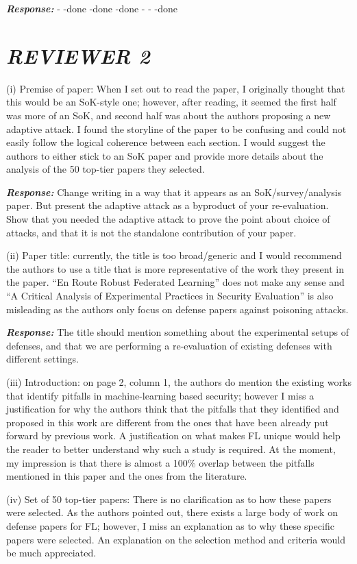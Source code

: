 \textbf{\textit{Response:}}
-
-done
-done
-done
-
-
-done


\section{\textbf{\textit{REVIEWER 2}}}

(i) Premise of paper: When I set out to read the paper, I originally thought that this would be an SoK-style one; however, after reading, it seemed the first half was more of an SoK, and second half was about the authors proposing a new adaptive attack. I found the storyline of the paper to be confusing and could not easily follow the logical coherence between each section. I would suggest the authors to either stick to an SoK paper and provide more details about the analysis of the 50 top-tier papers they selected.

\textbf{\textit{Response:}}
Change writing in a way that it appears as an SoK/survey/analysis paper. But present the adaptive attack as a byproduct of your re-evaluation. Show that you needed the adaptive attack to prove the point about choice of attacks, and that it is not the standalone contribution of your paper.

(ii) Paper title: currently, the title is too broad/generic and I would recommend the authors to use a title that is more representative of the work they present in the paper. “En Route Robust Federated Learning” does not make any sense and “A Critical Analysis of Experimental Practices in Security Evaluation” is also misleading as the authors only focus on defense papers against poisoning attacks.

\textbf{\textit{Response:}}
The title should mention something about the experimental setups of defenses, and that we are performing a re-evaluation of existing defenses with different settings.

(iii) Introduction: on page 2, column 1, the authors do mention the existing works that identify pitfalls in machine-learning based security; however I miss a justification for why the authors think that the pitfalls that they identified and proposed in this work are different from the ones that have been already put forward by previous work. A justification on what makes FL unique would help the reader to better understand why such a study is required. At the moment, my impression is that there is almost a 100\% overlap between the pitfalls mentioned in this paper and the ones from the literature.

(iv) Set of 50 top-tier papers: There is no clarification as to how these papers were selected. As the authors pointed out, there exists a large body of work on defense papers for FL; however, I miss an explanation as to why these specific papers were selected. An explanation on the selection method and criteria would be much appreciated.

